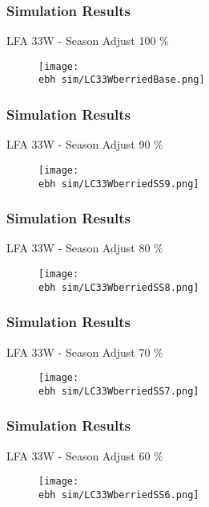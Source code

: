 \documentclass{beamer}
\newcommand{\ebh}{\string~/bio.data/bio.lobster/figures/LFA2733Framework2018/} %
\begin{document}

\begin{frame}
\frametitle{Simulation Results}
LFA 33W - Season Adjust 100 \%
\begin{figure}
        \begin{center}
            \texttt{[image: \\ebh sim/LC33WberriedBase.png]}
        \end{center}
    \end{figure}
\end{frame}


\begin{frame}
\frametitle{Simulation Results}
LFA 33W - Season Adjust 90 \%
\begin{figure}
        \begin{center}
            \texttt{[image: \\ebh sim/LC33WberriedSS9.png]}
        \end{center}
    \end{figure}
\end{frame}


\begin{frame}
\frametitle{Simulation Results}
LFA 33W - Season Adjust 80 \%
\begin{figure}
        \begin{center}
            \texttt{[image: \\ebh sim/LC33WberriedSS8.png]}
        \end{center}
    \end{figure}
\end{frame}


\begin{frame}
\frametitle{Simulation Results}
LFA 33W - Season Adjust 70 \%
\begin{figure}
        \begin{center}
            \texttt{[image: \\ebh sim/LC33WberriedSS7.png]}
        \end{center}
    \end{figure}
\end{frame}


\begin{frame}
\frametitle{Simulation Results}
LFA 33W - Season Adjust 60 \%
\begin{figure}
        \begin{center}
            \texttt{[image: \\ebh sim/LC33WberriedSS6.png]}
        \end{center}
    \end{figure}
\end{frame}
\end{document}
